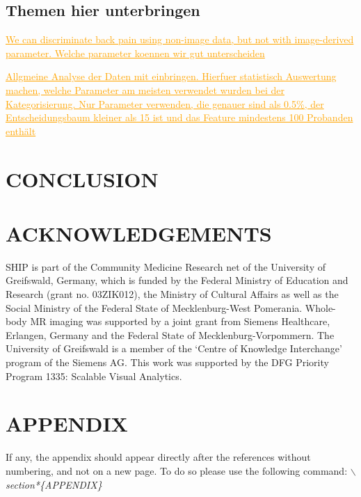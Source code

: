 \documentclass[a4paper,twoside]{style/article}
\newcommand{\com}[1]{\textcolor{orange}{\uline{#1}}}
\begin{document}
\subsection{Themen hier unterbringen}

\com{We can discriminate back pain using non-image data, but not with image-derived parameter. Welche parameter koennen wir gut unterscheiden}

\com{Allgmeine Analyse der Daten mit einbringen. Hierfuer statistisch Auswertung machen, welche Parameter am meisten verwendet wurden bei der Kategorisierung. Nur Parameter verwenden, die genauer sind als 0.5\%, der Entscheidungsbaum kleiner als 15 ist und das Feature mindestens 100 Probanden enthält }

\section{\uppercase{Conclusion}}
\label{sec:Conclusion}

\section*{\uppercase{Acknowledgements}}

\noindent SHIP is part of the Community Medicine Research net of the University of Greifswald, Germany, which is funded by the Federal Ministry of Education and Research (grant no. 03ZIK012), the Ministry of Cultural Affairs as well as the Social Ministry of the Federal State of Mecklenburg-West Pomerania. Whole-body MR imaging was supported by a joint grant from Siemens Healthcare, Erlangen, Germany and the Federal State of Mecklenburg-Vorpommern. The University of Greifswald is a member of the ‘Centre of Knowledge Interchange’ program of the Siemens AG. This work was supported by the DFG Priority Program 1335: Scalable Visual Analytics.


\vfill

{\small
}


\section*{\uppercase{Appendix}}

\noindent If any, the appendix should appear directly after the
references without numbering, and not on a new page. To do so please use the following command:
\textit{$\backslash$section*\{APPENDIX\}}

\vfill
\end{document}
